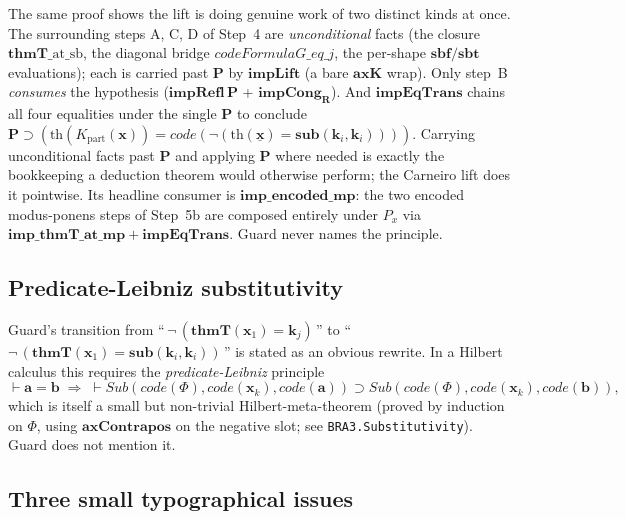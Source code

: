 \documentclass[11pt]{article}
\theoremstyle{plain}
\theoremstyle{definition}
\theoremstyle{remark}
\newcommand{\code}[1]{\mathit{code}(#1)}
\newcommand{\sub}{\mathbf{sub}}
\newcommand{\sbf}{\mathbf{sbf}}
\newcommand{\sbt}{\mathbf{sbt}}
\newcommand{\thmT}{\mathbf{thmT}}
\newcommand{\Sub}{\mathit{Sub}}
\begin{document}
The same proof shows the lift is doing genuine work of two distinct
kinds at once.  The surrounding steps A, C, D of Step~4 are
\emph{unconditional} facts (the closure $\thmT\_\mathrm{at}\_\mathrm{sb}$,
the diagonal bridge $\mathit{codeFormulaG\_eq\_j}$, the per-shape
$\sbf/\sbt$ evaluations); each is carried past $\mathbf{P}$ by
$\mathbf{impLift}$ (a bare $\mathbf{axK}$ wrap).  Only step~B
\emph{consumes} the hypothesis ($\mathbf{impRefl}\,\mathbf{P}$ +
$\mathbf{impCong_R}$).  And $\mathbf{impEqTrans}$ chains all four equalities
under the single $\mathbf{P}$ to conclude
$\mathbf{P} \supset (\mathrm{th}(K_{\mathrm{part}}(\mathbf{x})) =
\code{\neg(\mathrm{th}(\underline{\mathbf{x}}) = \sub(\mathbf{k}_i,\mathbf{k}_i))})$.
Carrying unconditional facts past $\mathbf{P}$ and applying $\mathbf{P}$
where needed is exactly the bookkeeping a deduction theorem would
otherwise perform; the Carneiro lift does it pointwise.  Its headline
consumer is $\mathbf{imp\_encoded\_mp}$: the two encoded modus-ponens
steps of Step~5b are composed entirely under $P_x$ via
$\mathbf{imp\_thmT\_at\_mp} + \mathbf{impEqTrans}$.  Guard never names the
principle.

\subsection{Predicate-Leibniz substitutivity}

Guard's transition from
``\,$\neg\,(\thmT(\mathbf{x}_1) = \mathbf{k}_j)$\,''
to
``\,$\neg\,(\thmT(\mathbf{x}_1) = \sub(\mathbf{k}_i, \mathbf{k}_i))$\,''
is stated as an obvious rewrite.  In a Hilbert calculus this requires
the \emph{predicate-Leibniz} principle
\[
\vdash \mathbf{a} = \mathbf{b} \;\Longrightarrow\; \vdash \Sub(\code{\Phi}, \code{\mathbf{x}_k}, \code{\mathbf{a}}) \supset \Sub(\code{\Phi}, \code{\mathbf{x}_k}, \code{\mathbf{b}}),
\]
which is itself a small but non-trivial Hilbert-meta-theorem (proved by
induction on $\Phi$, using $\mathbf{axContrapos}$ on the negative
slot; see \verb|BRA3.Substitutivity|).  Guard does not mention it.

\subsection{Three small typographical issues}
\end{document}
